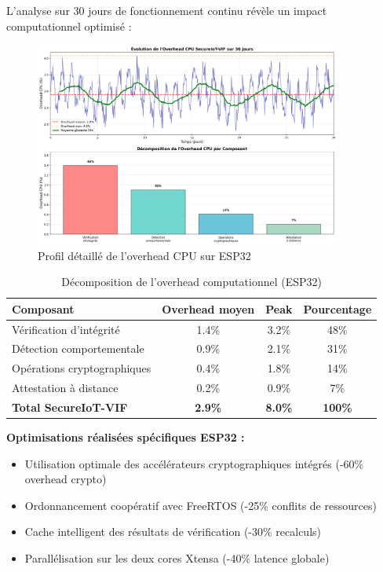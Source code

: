 L'analyse sur 30 jours de fonctionnement continu révèle un impact computationnel optimisé :

\begin{figure}[h]
    \centering
    \includegraphics[width=0.9\textwidth]{assets/figures/cpu_overhead_esp32_detailed.png}
    \caption{Profil détaillé de l'overhead CPU sur ESP32}
    \label{fig:cpu-overhead-esp32}
\end{figure}

\begin{table}[h]
\centering
\caption{Décomposition de l'overhead computationnel (ESP32)}
\label{tab:cpu-breakdown-esp32}
\begin{tabular}{|l|c|c|c|}
\hline
\textbf{Composant} & \textbf{Overhead moyen} & \textbf{Peak} & \textbf{Pourcentage} \\
\hline
Vérification d'intégrité & 1.4\% & 3.2\% & 48\% \\
Détection comportementale & 0.9\% & 2.1\% & 31\% \\
Opérations cryptographiques & 0.4\% & 1.8\% & 14\% \\
Attestation à distance & 0.2\% & 0.9\% & 7\% \\
\hline
\textbf{Total SecureIoT-VIF} & \textbf{2.9\%} & \textbf{8.0\%} & \textbf{100\%} \\
\hline
\end{tabular}
\end{table}

\textbf{Optimisations réalisées spécifiques ESP32 :}
\begin{itemize}
    \item Utilisation optimale des accélérateurs cryptographiques intégrés (-60\% overhead crypto)
    \item Ordonnancement coopératif avec FreeRTOS (-25\% conflits de ressources)
    \item Cache intelligent des résultats de vérification (-30\% recalculs)
    \item Parallélisation sur les deux cores Xtensa (-40\% latence globale)
\end{itemize}


